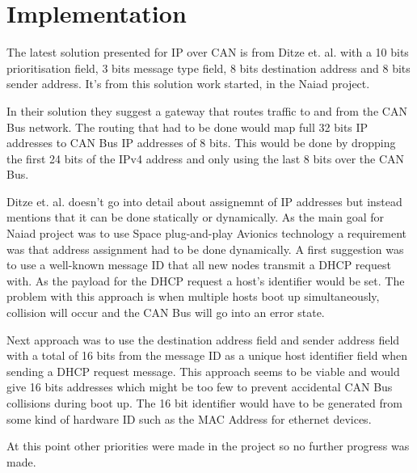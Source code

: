\section{Implementation}\label{sec:implementation}
The latest solution presented for IP over CAN is from Ditze et. al. with a 10
bits prioritisation field, 3 bits message type field, 8 bits destination
address and 8 bits sender address. It's from this solution work started, in the
Naiad project.

In their solution they suggest a gateway that routes traffic to and from the
CAN Bus network. The routing that had to be done would map full 32 bits IP
addresses to CAN Bus IP addresses of 8 bits. This would be done by dropping the
first 24 bits of the IPv4 address and only using the last 8 bits over the CAN
Bus.

Ditze et. al. doesn't go into
detail about assignemnt of IP addresses
but instead mentions that it can be done statically or dynamically. As the main
goal for Naiad project was to use Space plug-and-play Avionics
technology a requirement was that address assignment had to be done
dynamically. A first suggestion was to use a well-known message ID that all new
nodes transmit a DHCP request with. As the payload for the DHCP request a
host's identifier would be set.
The problem with this approach is when multiple hosts boot up
simultaneously, collision will occur and the CAN Bus will go into an error
state.

Next approach was to use the destination address field and sender address field
with a total of 16 bits from the message ID as a unique host identifier field
when sending a DHCP request message. This approach seems to be viable and would
give 16 bits addresses which might be too few to prevent accidental CAN Bus
collisions during boot up. The 16 bit identifier would have to be generated
from some kind of hardware ID such as the MAC Address for ethernet devices.

At this point other priorities were made in the project so no further progress
was made.

